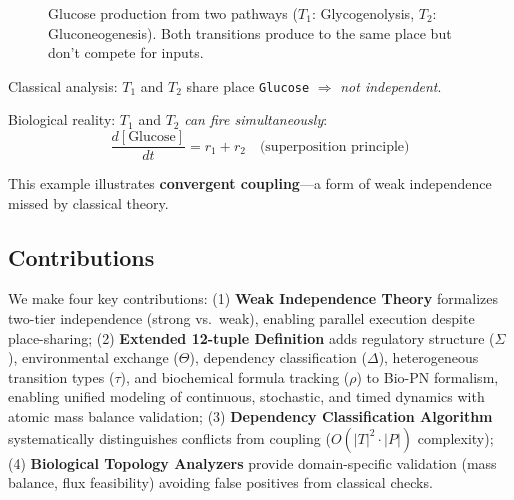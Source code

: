 \documentclass[twocolumn,11pt]{article}
\begin{document}
\begin{figure}[t]
\centering
{}
\caption{Glucose production from two pathways ($T_1$: Glycogenolysis, $T_2$: Gluconeogenesis). Both transitions produce to the same place but don't compete for inputs.}
\label{fig:glucose_example}
\end{figure}

Classical analysis: $T_1$ and $T_2$ share place \texttt{Glucose} $\Rightarrow$ \emph{not independent}.

Biological reality: $T_1$ and $T_2$ \emph{can fire simultaneously}:
\begin{equation}
\frac{d[\text{Glucose}]}{dt} = r_1 + r_2 \quad \text{(superposition principle)}
\end{equation}

This example illustrates \textbf{convergent coupling}---a form of weak independence missed by classical theory.

\subsection{Contributions}
We make four key contributions: (1) \textbf{Weak Independence Theory} formalizes two-tier independence (strong vs.\ weak), enabling parallel execution despite place-sharing; (2) \textbf{Extended 12-tuple Definition} adds regulatory structure ($\Sigma$), environmental exchange ($\Theta$), dependency classification ($\Delta$), heterogeneous transition types ($\tau$), and biochemical formula tracking ($\rho$) to Bio-PN formalism, enabling unified modeling of continuous, stochastic, and timed dynamics with atomic mass balance validation; (3) \textbf{Dependency Classification Algorithm} systematically distinguishes conflicts from coupling ($O(|T|^2 \cdot |P|)$ complexity); (4) \textbf{Biological Topology Analyzers} provide domain-specific validation (mass balance, flux feasibility) avoiding false positives from classical checks.
\end{document}
